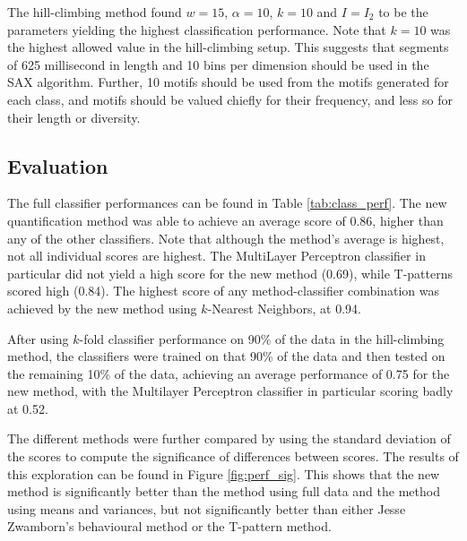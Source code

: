 \documentclass[conference,a4paper,twoside]{IEEEtran}
\begin{document}
The hill-climbing method found $w=15$, $\alpha=10$, $k=10$ and $I=I_2$ to be the parameters yielding the highest classification performance. Note that $k=10$ was the highest allowed value in the hill-climbing setup. This suggests that segments of 625 millisecond in length and 10 bins per dimension should be used in the SAX algorithm. Further, 10 motifs should be used from the motifs generated for each class, and motifs should be valued chiefly for their frequency, and less so for their length or diversity.

\subsection{Evaluation}
\label{sec:results_evaluate}

The full classifier performances can be found in Table \ref{tab:class_perf}. The new quantification method was able to achieve an average score of 0.86, higher than any of the other classifiers. Note that although the method's average is highest, not all individual scores are highest. The MultiLayer Perceptron classifier in particular did not yield a high score for the new method (0.69), while T-patterns scored high (0.84). The highest score of any method-classifier combination was achieved by the new method using $k$-Nearest Neighbors, at 0.94.

After using $k$-fold classifier performance on 90\% of the data in the hill-climbing method, the classifiers were trained on that 90\% of the data and then tested on the remaining 10\% of the data, achieving an average performance of 0.75 for the new method, with the Multilayer Perceptron classifier in particular scoring badly at 0.52.

The different methods were further compared by using the standard deviation of the scores to compute the significance of differences between scores. The results of this exploration can be found in Figure \ref{fig:perf_sig}. This shows that the new method is significantly better than the method using full data and the method using means and variances, but not significantly better than either Jesse Zwamborn's behavioural method or the T-pattern method.
\end{document}
